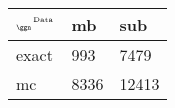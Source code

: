 \begin{tabular}{lll}
    \toprule
    $_{\text{\tiny{\ggn}}}$$^{\text{\tiny{Data}}}$ & mb & sub \\
    \midrule
    exact & 993
              & 7479 \\
    mc   & 8336
              & 12413 \\
    \bottomrule
\end{tabular}